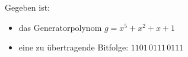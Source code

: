 \begin{questions}
\begin{parts}
		
	\end{parts}

	\begin{landscape}
	\question Gegeben ist:
	\begin{itemize}
		\item das Generatorpolynom $g = x^5 + x^2 + x + 1$
		\item eine zu übertragende Bitfolge: $1101\,0111\,0111$
	\end{itemize}


\end{landscape}
\end{questions}
